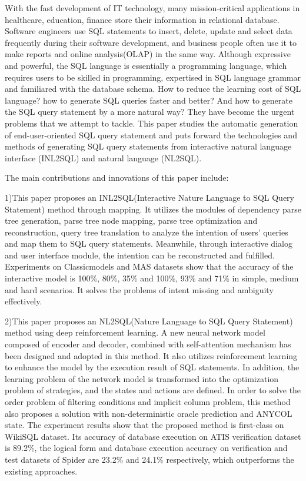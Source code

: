 \begin{englishabstract}


With the fast development of IT technology, many mission-critical applications in healthcare, education, finance store their information in relational database.
Software engineers use SQL statements to insert, delete, update and select data frequently during their software development, and business people often use it to make reports and online analysis(OLAP) in the same way.
Although expressive and powerful, the SQL language is essentially a programming language, which requires users to be skilled in programming, expertised in SQL language grammar and familiared with the database schema.
How to reduce the learning cost of SQL language? how to generate SQL queries faster and better? And how to generate the SQL query statement by a more natural way? They have become the urgent problems that we attempt to tackle.
This paper studies the automatic generation of end-user-oriented SQL query statement and puts forward the technologies and methods of generating SQL query statements from interactive natural language interface (INL2SQL) and natural language (NL2SQL).

The main contributions and innovations of this paper include:

1)This paper proposes an INL2SQL(Interactive Nature Language to SQL Query Statement) method through mapping.
It utilizes the modules of dependency parse tree generation, parse tree node mapping, parse tree optimization and reconstruction, query tree translation to analyze the intention of users' queries and map them to SQL query statements.
Meanwhile, through interactive dialog and user interface module, the intention can be reconstructed and fulfilled.
Experiments on Classicmodels and MAS datasets show that the accuracy of the interactive model is 100\%, 80\%, 35\% and 100\%, 93\% and 71\% in simple, medium and hard scenarios. It solves the problems of intent missing and ambiguity effectively.

2)This paper proposes an NL2SQL(Nature Language to SQL Query Statement) method using deep reinforcement learning.
A new neural network model composed of encoder and decoder, combined with self-attention mechanism has been designed and adopted in this method. It also utilizes reinforcement learning to enhance the model by the execution result of SQL statements.
In addition, the learning problem of the network model is transformed into the optimization problem of strategies, and the states and actions are defined.
In order to solve the order problem of filtering conditions and implicit column problem, this method also proposes a solution with non-deterministic oracle prediction and ANYCOL state.
The experiment results show that the proposed method is first-class on WikiSQL dataset. Its accuracy of database execution on ATIS verification dataset is 89.2\%, the logical form and database execution accuracy on verification and test datasets of Spider are 23.2\% and 24.1\% respectively, which outperforms the existing approaches.


\end{englishabstract}

